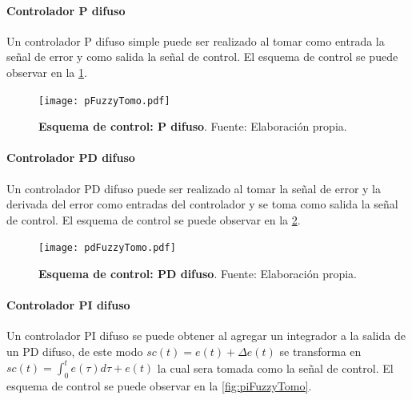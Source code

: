             \paragraph{Controlador P difuso}
                
                Un controlador P difuso simple puede ser realizado al tomar como entrada la señal de error y como salida la señal de control. El esquema de control se puede observar en la \cref{fig:pFuzzyTomo}.

                \begin{figure}[htb]
                    \centering
                    \texttt{[image: pFuzzyTomo.pdf]}
                    \caption[Esquema de control: P difuso]{\textbf{Esquema de control: P difuso}. Fuente: Elaboración propia.} 
                    \label{fig:pFuzzyTomo}
                \end{figure}

            \paragraph{Controlador PD difuso}
                
                Un controlador PD difuso puede ser realizado al tomar la señal de error y la derivada del error como entradas del controlador y se toma como salida la señal de control. El esquema de control se puede observar en la \cref{fig:pdFuzzyTomo}.

                \begin{figure}[htb]
                    \centering
                    \texttt{[image: pdFuzzyTomo.pdf]}
                    \caption[Esquema de control: PD difuso]{\textbf{Esquema de control: PD difuso}. Fuente: Elaboración propia.} 
                    \label{fig:pdFuzzyTomo}
                \end{figure}
            
            \paragraph{Controlador PI difuso}
                
                Un controlador PI difuso se puede obtener al agregar un integrador a la salida de un PD difuso, de este modo $sc(t) = e(t) + \Delta e(t)$ se transforma en $sc(t) = \int_0^t e(\tau)d\tau + e(t)$ la cual sera tomada como la señal de control. El esquema de control se puede observar en la \cref{fig:piFuzzyTomo}.

